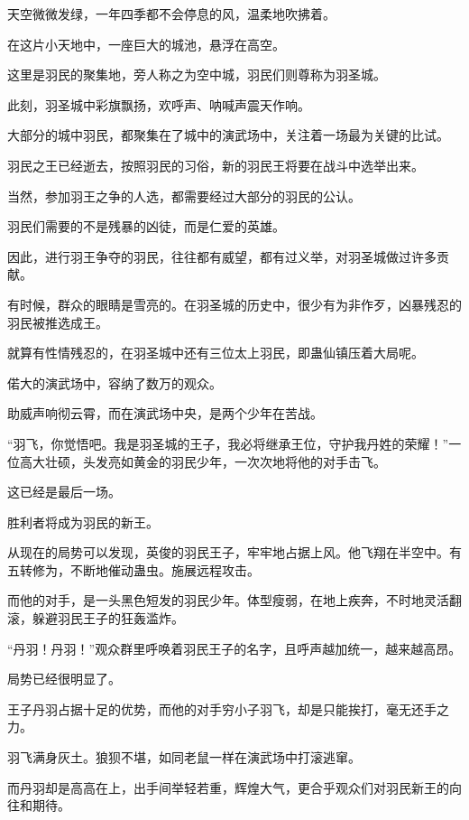 
\begin{this_body}

天空微微发绿，一年四季都不会停息的风，温柔地吹拂着。

在这片小天地中，一座巨大的城池，悬浮在高空。

这里是羽民的聚集地，旁人称之为空中城，羽民们则尊称为羽圣城。

此刻，羽圣城中彩旗飘扬，欢呼声、呐喊声震天作响。

大部分的城中羽民，都聚集在了城中的演武场中，关注着一场最为关键的比试。

羽民之王已经逝去，按照羽民的习俗，新的羽民王将要在战斗中选举出来。

当然，参加羽王之争的人选，都需要经过大部分的羽民的公认。

羽民们需要的不是残暴的凶徒，而是仁爱的英雄。

因此，进行羽王争夺的羽民，往往都有威望，都有过义举，对羽圣城做过许多贡献。

有时候，群众的眼睛是雪亮的。在羽圣城的历史中，很少有为非作歹，凶暴残忍的羽民被推选成王。

就算有性情残忍的，在羽圣城中还有三位太上羽民，即蛊仙镇压着大局呢。

偌大的演武场中，容纳了数万的观众。

助威声响彻云霄，而在演武场中央，是两个少年在苦战。

“羽飞，你觉悟吧。我是羽圣城的王子，我必将继承王位，守护我丹姓的荣耀！”一位高大壮硕，头发亮如黄金的羽民少年，一次次地将他的对手击飞。

这已经是最后一场。

胜利者将成为羽民的新王。

从现在的局势可以发现，英俊的羽民王子，牢牢地占据上风。他飞翔在半空中。有五转修为，不断地催动蛊虫。施展远程攻击。

而他的对手，是一头黑色短发的羽民少年。体型瘦弱，在地上疾奔，不时地灵活翻滚，躲避羽民王子的狂轰滥炸。

“丹羽！丹羽！”观众群里呼唤着羽民王子的名字，且呼声越加统一，越来越高昂。

局势已经很明显了。

王子丹羽占据十足的优势，而他的对手穷小子羽飞，却是只能挨打，毫无还手之力。

羽飞满身灰土。狼狈不堪，如同老鼠一样在演武场中打滚逃窜。

而丹羽却是高高在上，出手间举轻若重，辉煌大气，更合乎观众们对羽民新王的向往和期待。


\end{this_body}

